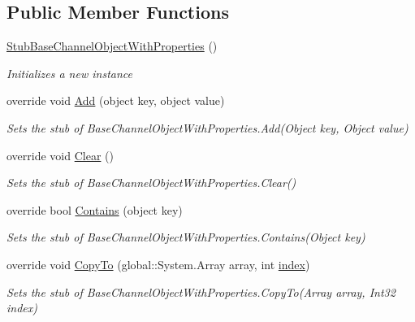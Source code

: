 \subsection*{Public Member Functions}
\begin{DoxyCompactItemize}
\item 
\hyperlink{class_system_1_1_runtime_1_1_remoting_1_1_channels_1_1_fakes_1_1_stub_base_channel_object_with_properties_a084c413f9c009f1c1c0044c73bd8b5b8}{Stub\-Base\-Channel\-Object\-With\-Properties} ()
\begin{DoxyCompactList}\small\item\em Initializes a new instance\end{DoxyCompactList}\item 
override void \hyperlink{class_system_1_1_runtime_1_1_remoting_1_1_channels_1_1_fakes_1_1_stub_base_channel_object_with_properties_a6eadaade64e366bda87f6fdcc92fab4d}{Add} (object key, object value)
\begin{DoxyCompactList}\small\item\em Sets the stub of Base\-Channel\-Object\-With\-Properties.\-Add(\-Object key, Object value)\end{DoxyCompactList}\item 
override void \hyperlink{class_system_1_1_runtime_1_1_remoting_1_1_channels_1_1_fakes_1_1_stub_base_channel_object_with_properties_acad5ad197dceae297edb7c1b98d76a44}{Clear} ()
\begin{DoxyCompactList}\small\item\em Sets the stub of Base\-Channel\-Object\-With\-Properties.\-Clear()\end{DoxyCompactList}\item 
override bool \hyperlink{class_system_1_1_runtime_1_1_remoting_1_1_channels_1_1_fakes_1_1_stub_base_channel_object_with_properties_a79faa3e04ad85626b3c2d99b8f6c7f68}{Contains} (object key)
\begin{DoxyCompactList}\small\item\em Sets the stub of Base\-Channel\-Object\-With\-Properties.\-Contains(\-Object key)\end{DoxyCompactList}\item 
override void \hyperlink{class_system_1_1_runtime_1_1_remoting_1_1_channels_1_1_fakes_1_1_stub_base_channel_object_with_properties_aeddf057fb7f2a2bba329805635e1b211}{Copy\-To} (global\-::\-System.\-Array array, int \hyperlink{jquery-1_810_82-vsdoc_8js_a75bb12d1f23302a9eea93a6d89d0193e}{index})
\begin{DoxyCompactList}\small\item\em Sets the stub of Base\-Channel\-Object\-With\-Properties.\-Copy\-To(\-Array array, Int32 index)\end{DoxyCompactList}\item 

\end{DoxyCompactItemize}
